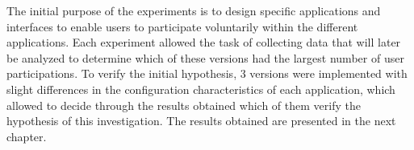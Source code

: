The initial purpose of the experiments is to design specific applications and
interfaces to enable users to participate voluntarily within the different
applications. Each experiment allowed the task of collecting data that will
later be analyzed to determine which of these versions had the largest number of
user participations. To verify the initial hypothesis, 3  versions were implemented with 
slight differences in the configuration characteristics of each application, 
which allowed to decide through the results obtained which of them verify the 
hypothesis of this investigation. The results obtained
are presented in the next chapter.
